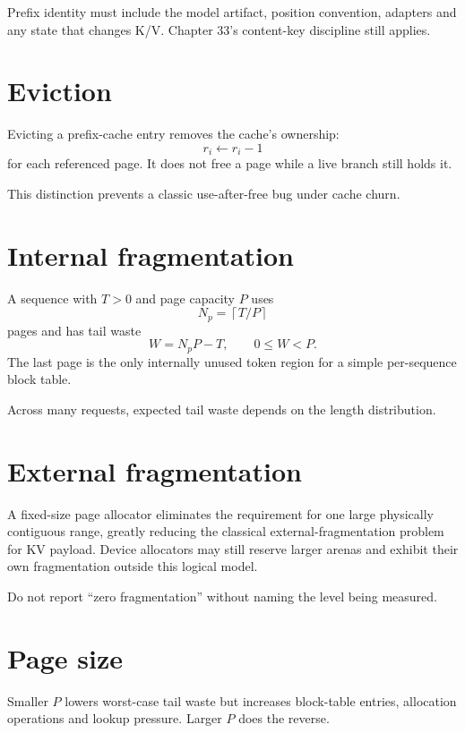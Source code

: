 
Prefix identity must include the model artifact, position convention, adapters and any state that changes K/V. Chapter 33's content-key discipline still applies.

\section{Eviction}
Evicting a prefix-cache entry removes the cache's ownership:
\[
r_i\leftarrow r_i-1
\]
for each referenced page. It does not free a page while a live branch still holds it.

This distinction prevents a classic use-after-free bug under cache churn.

\section{Internal fragmentation}
A sequence with $T>0$ and page capacity $P$ uses
\[
N_p=\left\lceil T/P\right\rceil
\]
pages and has tail waste
\[
W=N_pP-T,\qquad 0\le W<P.
\]
The last page is the only internally unused token region for a simple per-sequence block table.

Across many requests, expected tail waste depends on the length distribution.


\section{External fragmentation}
A fixed-size page allocator eliminates the requirement for one large physically contiguous range, greatly reducing the classical external-fragmentation problem for KV payload. Device allocators may still reserve larger arenas and exhibit their own fragmentation outside this logical model.

Do not report ``zero fragmentation'' without naming the level being measured.

\section{Page size}
Smaller $P$ lowers worst-case tail waste but increases block-table entries, allocation operations and lookup pressure. Larger $P$ does the reverse.

